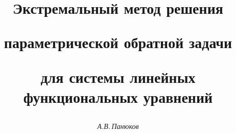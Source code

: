 









\newcommand{\card}{\operatorname{card}}


\newcommand{\mes}{\operatorname{mes}}


\newcommand{\tts}[1]{}







\setcounter{page}{27}















\author{\it А.В.\,Панюков }




\title{Экстремальный метод решения


параметрической обратной задачи


для системы линейных функциональных уравнений}





\date{}




\pagestyle{plain} %







\maketitle


